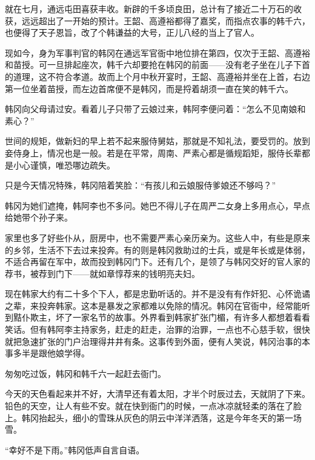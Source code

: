 就在七月，通远屯田喜获丰收。新辟的千多顷良田，总计有了接近二十万石的收获，远远超出了一开始的预计。王韶、高遵裕都得了嘉奖，而指点农事的韩千六，也便得了天子恩旨，改了个韩谦益的大号，正儿八经的当上了官人。

现如今，身为军事判官的韩冈在通远军官衙中地位排在第四，仅次于王韶、高遵裕和苗授。可一旦排起座次，韩千六却要抢在韩冈的前面——没有老子坐在儿子下首的道理，这不符合孝道。故而上个月中秋开宴时，王韶、高遵裕并坐在上首，右边第一位坐着苗授，而左边首席便不是韩冈，而是捋着胡须一直在笑的韩千六。

韩冈向父母请过安。看着儿子只带了云娘过来，韩阿李便问着：“怎么不见南娘和素心？”

世间的规矩，做新妇的早上若不起来服侍舅姑，那就是不知礼法，要受罚的。放到妾侍身上，情况也是一般。若是在平常，周南、严素心都是循规蹈矩，服侍长辈都是小心谨慎，唯恐哪边疏失。

只是今天情况特殊，韩冈陪着笑脸：“有孩儿和云娘服侍爹娘还不够吗？”

韩冈为她们遮掩，韩阿李也不多问。她巴不得儿子在周严二女身上多用点心，早点给她带个孙子来。

家里也多了好些仆从，厨房中，也不需要严素心亲历亲为。这些人中，有些是原来的乡邻，生活不下去过来投奔。有的则是韩冈救助过的士兵，或是年长或是体弱，不适合再留在军中，故而投到韩冈门下。还有几个，是领了与韩冈交好的官人家的荐书，被荐到门下——就如章惇荐来的钱明亮夫妇。

现在韩家大约有二十多个下人，都是忠勤听话的。并不是没有有作奸犯、心怀诡谲之辈，来投奔韩家。这本是暴发之家都难以免除的情况。韩冈在官衙中，经常能听到黠仆欺主，坏了一家名节的故事。外界看到韩家扩张门楣，有许多人都想着看看笑话。但有韩阿李主持家务，赶走的赶走，治罪的治罪，一点也不心慈手软，很快就把急速扩张的门户治理得井井有条。这事传到外面，便有人笑说，韩冈治事的本事多半是跟他娘学得。

匆匆吃过饭，韩冈和韩千六一起赶去衙门。

今天的天色看起来并不好，大清早还有着太阳，才半个时辰过去，天就阴了下来。铅色的天空，让人有些不安。就在快到衙门的时候，一点冰凉就轻柔的落在了脸上。韩冈抬起头，细小的雪珠从灰色的阴云中洋洋洒落，这是今年冬天的第一场雪。

“幸好不是下雨。”韩冈低声自言自语。

